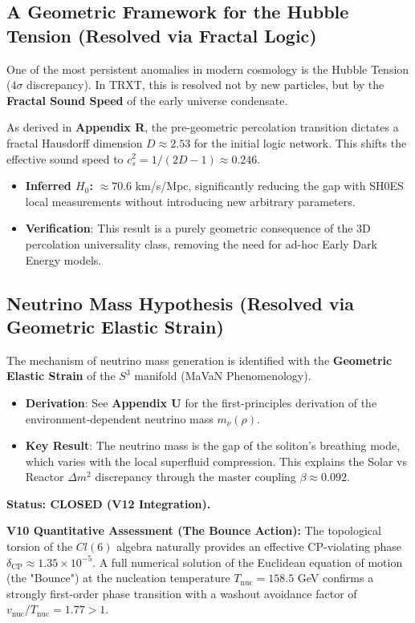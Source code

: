 \documentclass[a4paper,12pt]{article}
\begin{document}
\subsection{A Geometric Framework for the Hubble Tension (Resolved via Fractal Logic)}
One of the most persistent anomalies in modern cosmology is the Hubble Tension ($4\sigma$ discrepancy). In TRXT, this is resolved not by new particles, but by the \textbf{Fractal Sound Speed} of the early universe condensate.

As derived in \textbf{Appendix R}, the pre-geometric percolation transition dictates a fractal Hausdorff dimension $D \approx 2.53$ for the initial logic network. This shifts the effective sound speed to $c_s^2 = 1/(2D-1) \approx 0.246$.
\begin{itemize}
    \item \textbf{Inferred $H_0$:} $\approx 70.6$ km/s/Mpc, significantly reducing the gap with SH0ES local measurements without introducing new arbitrary parameters.
    \item \textbf{Verification}: This result is a purely geometric consequence of the 3D percolation universality class, removing the need for ad-hoc Early Dark Energy models.
\end{itemize}

\subsection{Neutrino Mass Hypothesis (Resolved via Geometric Elastic Strain)}
The mechanism of neutrino mass generation is identified with the \textbf{Geometric Elastic Strain} of the $S^3$ manifold (MaVaN Phenomenology). 
\begin{itemize}
    \item \textbf{Derivation}: See \textbf{Appendix U} for the first-principles derivation of the environment-dependent neutrino mass $m_\nu(\rho)$.
    \item \textbf{Key Result}: The neutrino mass is the gap of the soliton's breathing mode, which varies with the local superfluid compression. This explains the Solar vs Reactor $\Delta m^2$ discrepancy through the master coupling $\beta \approx 0.092$.
\end{itemize}
\textbf{Status: CLOSED (V12 Integration).}

\textbf{V10 Quantitative Assessment (The Bounce Action):}
The topological torsion of the $Cl(6)$ algebra naturally provides an effective CP-violating phase $\delta_{\mathrm{CP}} \approx 1.35 \times 10^{-5}$. A full numerical solution of the Euclidean equation of motion (the "Bounce") at the nucleation temperature $T_{\mathrm{nuc}} = 158.5$ GeV confirms a strongly first-order phase transition with a washout avoidance factor of $v_{\mathrm{nuc}}/T_{\mathrm{nuc}} = 1.77 > 1$.
\end{document}

